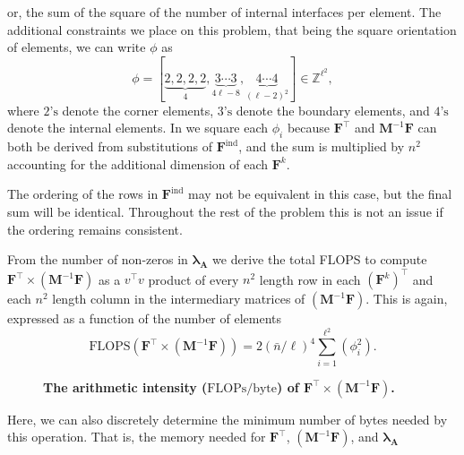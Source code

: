 or, the sum of the square of the number of internal interfaces per element. 
The additional constraints we place on this problem, that being the square orientation of elements, we can write $\phi$ as 
\begin{equation}
	\phi = \left[ \underbrace{2, 2, 2, 2}_{4}, \underbrace{3 \cdots 3}_{4\ell - 8}, \underbrace{4 \cdots 4}_{(\ell-2)^2} \right] \in \mathbb{Z}^{\ell^2}, 
\end{equation}
where $2\text{'s}$ denote the corner elements, $3\text{'s}$ denote the boundary elements, and $4\text{'s}$ denote the internal elements. 
In  we square each $\phi_i$ because $\textbf{F}^{\intercal}$ and  $\textbf{M}^{-1}\textbf{F}$ can both be derived from substitutions of $\textbf{F}^{\text{ind}}$, and the sum is multiplied by $n^2$ accounting for the additional dimension of each $\textbf{F}^k$. 

%
%


%
%
%
The ordering of the rows in $\textbf{F}^{\text{ind}}$ may not be equivalent in this case, but the final sum will be identical. 
Throughout the rest of the problem this is not an issue if the ordering remains consistent. 

%
%
%
From the number of non-zeros in $\symbf{\lambda}_\textbf{A}$ we derive the total FLOPS to compute $\textbf{F}^{\intercal} \times (\textbf{M}^{-1}\textbf{F})$ as a $v^\intercal v$ product of every $n^2$ length row in each $(\textbf{F}^k)^{\intercal}$ and each $n^2$ length column in the intermediary matrices of $(\textbf{M}^{-1}\textbf{F})$.
This is again, expressed as a function of the number of elements
\begin{equation}
	\text{FLOPS}(\textbf{F}^{\intercal} \times (\textbf{M}^{-1}\textbf{F})) = 2 (\bar{n}/\ell)^4 \sum_{i=1}^{\ell^2} (\phi_i^2).
	\label{eqn:flops_fmf}
\end{equation}

%
%
%
\begin{figure}
	{\centering 
	}
	\caption{\textbf{The arithmetic intensity ($\text{FLOPs}/\text{byte}$) of $\textbf{F}^\intercal \times (\textbf{M}^{-1} \textbf{F})$.}}
	\label{fig:ftmt_ai}
\end{figure}

\noindent
Here, we can also discretely determine the minimum number of bytes needed by this operation. 
That is, the memory needed for $\textbf{F}^{\intercal}$, $(\textbf{M}^{-1}\textbf{F})$, and $\symbf{\lambda}_\textbf{A}$

